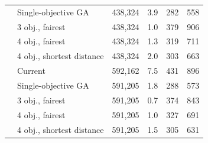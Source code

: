 \begin{table}[htbp]
\begin{tabular}{llrrrr}
 & Single-objective GA & 438,324 & 3.9 & 282 & 558 \\
 & 3 obj., fairest & 438,324 & 1.0 & 379 & 906 \\
 & 4 obj., fairest & 438,324 & 1.3 & 319 & 711 \\
 & 4 obj., shortest distance & 438,324 & 2.0 & 303 & 663 \\
\midrule
{} & Current & 592,162 & 7.5 & 431 & 896 \\
 & Single-objective GA & 591,205 & 1.8 & 288 & 573 \\
 & 3 obj., fairest & 591,205 & 0.7 & 374 & 843 \\
 & 4 obj., fairest & 591,205 & 1.0 & 327 & 691 \\
 & 4 obj., shortest distance & 591,205 & 1.5 & 305 & 631 \\
\bottomrule
\end{tabular}
\end{table}
